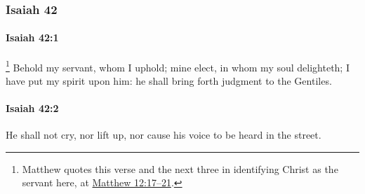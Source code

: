 	\subsubsection{Isaiah 42} %
		\label{ISAIAH-42}

		\paragraph{Isaiah 42:1} %
			\label{ISAIAH-42-1}

				\footnote{%
					Matthew quotes this verse and the next three in identifying Christ as the servant here, at \hyperref[MATTHEW-12-17]{Matthew 12:17--21}.
					}%
			Behold my servant, whom I uphold; mine elect, in whom my soul delighteth; I have put my spirit upon him: he shall bring forth judgment to the Gentiles.


		\paragraph{Isaiah 42:2} %
			\label{ISAIAH-42-2}

			He shall not cry, nor lift up, nor cause his voice to be heard in the street.

